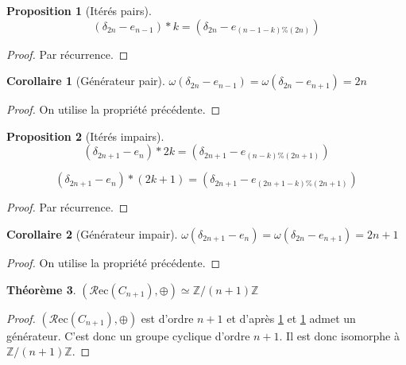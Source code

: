 \documentclass{report}
\newtheorem{theorem}{Théorème}[chapter]
\newtheorem{property}[theorem]{Proposition}
\newtheorem{corollary}{Corollaire}[theorem]
\newcommand{\recu}[1]{\ensuremath{\mathcal{R}\text{ec}(#1)}}
\newcommand{\plus}{\ensuremath{\oplus}}
\begin{document}
\begin{property}[Itérés pairs]
$$ (\delta_{2n} - e_{n-1}) * k = (\delta_{2n} - e_{(n-1-k) \% (2n)})$$
\end{property}
\begin{proof}
Par récurrence.
\end{proof}

\begin{corollary}[Générateur pair] \label{gen_p}
$\omega(\delta_{2n} - e_{n-1}) = \omega(\delta_{2n} - e_{n+1}) = 2n $
\end{corollary}
\begin{proof}
On utilise la propriété précédente.
\end{proof}


\begin{property}[Itérés impairs]
$$ (\delta_{2n+1} - e_{n}) * 2k = (\delta_{2n+1} - e_{(n-k) \% (2n+1)})$$

$$ (\delta_{2n+1} - e_{n}) * (2k+1) = (\delta_{2n+1} - e_{(2n+1-k) \% (2n+1)})$$
\end{property}
\begin{proof}
Par récurrence.
\end{proof}

\begin{corollary}[Générateur impair] \label{gen_ip}
$\omega(\delta_{2n+1} - e_{n}) = \omega(\delta_{2n} - e_{n+1}) = 2n+1 $
\end{corollary}
\begin{proof}
On utilise la propriété précédente.
\end{proof}


\begin{theorem} \label{isocycle}
$(\recu{C_{n+1}}, \plus{}) \simeq \mathbb{Z}/(n+1)\mathbb{Z}$
\end{theorem}
\begin{proof}
$(\recu{C_{n+1}}, \plus{})$ est d'ordre $n+1$ et d'après \ref{gen_p} et \ref{gen_p} admet un générateur. C'est donc un groupe cyclique d'ordre $n+1$. Il est donc isomorphe à $\mathbb{Z}/(n+1)\mathbb{Z}$.
\end{proof}
\end{document}

